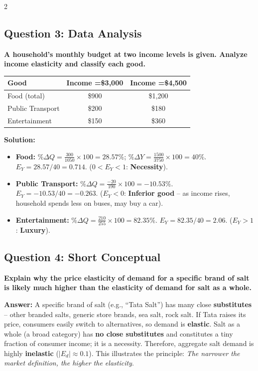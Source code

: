 \documentclass[10pt,a4paper]{article}
\begin{document}
\begin{multicols}{2}
\vspace{0.2cm}

\subsection*{Question 3: Data Analysis}
\textbf{A household's monthly budget at two income levels is given. Analyze income elasticity and classify each good.}

\begin{center}
\begin{tabular}{@{}lcc@{}}
\toprule
\textbf{Good} & \textbf{Income =\$3,000} & \textbf{Income =\$4,500} \\
\midrule
Food (total) & \$900 & \$1,200 \\
Public Transport & \$200 & \$180 \\
Entertainment & \$150 & \$360 \\
\bottomrule
\end{tabular}
\end{center}

\textbf{Solution:}
\begin{itemize}[leftmargin=*,nosep]
    \item \textbf{Food:} $\%\Delta Q = \frac{300}{1050} \times 100 = 28.57\%$; $\%\Delta Y = \frac{1500}{3750} \times 100 = 40\%$. $E_Y = 28.57/40 = 0.714$. ($0 < E_Y < 1$: \textbf{Necessity}).
    \item \textbf{Public Transport:} $\%\Delta Q = \frac{-20}{190} \times 100 = -10.53\%$. $E_Y = -10.53/40 = -0.263$. ($E_Y < 0$: \textbf{Inferior good} -- as income rises, household spends less on buses, may buy a car).
    \item \textbf{Entertainment:} $\%\Delta Q = \frac{210}{255} \times 100 = 82.35\%$. $E_Y = 82.35/40 = 2.06$. ($E_Y > 1$: \textbf{Luxury}).
\end{itemize}

\vspace{0.2cm}

\subsection*{Question 4: Short Conceptual}
\textbf{Explain why the price elasticity of demand for a specific brand of salt is likely much higher than the elasticity of demand for salt as a whole.}

\textbf{Answer:} A specific brand of salt (e.g., ``Tata Salt'') has many close \textbf{substitutes} -- other branded salts, generic store brands, sea salt, rock salt. If Tata raises its price, consumers easily switch to alternatives, so demand is \textbf{elastic}. Salt as a whole (a broad category) has \textbf{no close substitutes} and constitutes a tiny fraction of consumer income; it is a necessity. Therefore, aggregate salt demand is highly \textbf{inelastic} ($|E_d| \approx 0.1$). This illustrates the principle: \textit{The narrower the market definition, the higher the elasticity}.

\end{multicols}
\end{document}
